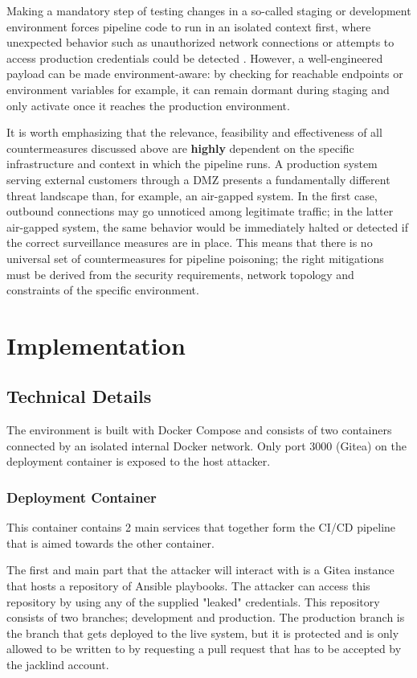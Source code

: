 \documentclass{article}
\begin{document}
Making a mandatory step of testing changes in a so-called staging or development environment forces pipeline code to run in an isolated context first, where unexpected behavior such as unauthorized network connections or attempts to access production credentials could be detected \cite{owaspPPE}. However, a well-engineered payload can be made environment-aware: by checking for reachable endpoints or environment variables for example, it can remain dormant during staging and only activate once it reaches the production environment.

It is worth emphasizing that the relevance, feasibility and effectiveness of all countermeasures discussed above are \textbf{highly} dependent on the specific infrastructure and context in which the pipeline runs. A production system serving external customers through a DMZ presents a fundamentally different threat landscape than, for example, an air-gapped system. In the first case, outbound connections may go unnoticed among legitimate traffic; in the latter air-gapped system, the same behavior would be immediately halted or detected if the correct surveillance measures are in place. This means that there is no universal set of countermeasures for pipeline poisoning; the right mitigations must be derived from the security requirements, network topology and constraints of the specific environment.

\section{Implementation}

\subsection{Technical Details}

The environment is built with Docker Compose and consists of two containers connected by an isolated internal Docker network. Only port 3000 (Gitea) on the deployment container is exposed to the host attacker.

\subsubsection{Deployment Container}

This container contains 2 main services that together form the CI/CD pipeline that is aimed towards the other container.

The first and main part that the attacker will interact with is a Gitea instance that hosts a repository of Ansible playbooks. The attacker can access this repository by using any of the supplied "leaked" credentials. This repository consists of two branches; development and production. The production branch is the branch that gets deployed to the live system, but it is protected and is only allowed to be written to by requesting a pull request \cite{giteaPR} that has to be accepted by the jacklind account.
\end{document}
